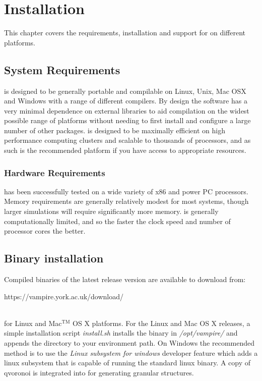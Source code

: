 \chapter{Installation}\label{chap:installation}

This chapter covers the requirements, installation and support for \vampire on different platforms. 

\section*{System Requirements}
\vampire is designed to be generally portable and compilable on Linux, Unix, Mac OSX and Windows with a range of different compilers. By design the software has a very minimal dependence on external libraries to aid compilation on the widest possible range of platforms without needing to first install and configure a large number of other packages. \vampire is designed to be maximally efficient on high performance computing clusters and scalable to thousands of processors, and as such is the recommended platform if you have access to appropriate resources. 

\subsection*{Hardware Requirements}
\vampire has been successfully tested on a wide variety of x86 and power PC processors. Memory requirements are generally relatively modest for most systems, though larger simulations will require significantly more memory. \vampire is generally computationally limited, and so the faster the clock speed and number of processor cores the better.

\section*{Binary installation}
Compiled binaries of the latest release version are available to download from:\\

\begin{minipage}[c]{\textwidth}
\centering
https://vampire.york.ac.uk/download/
\end{minipage}\\

\noindent for Linux and Mac$^{\mathrm{TM}}$ OS X platforms. For the Linux and Mac OS X releases, a simple installation script \textit{install.sh} installs the binary in \textit{/opt/vampire/} and appends the directory to your environment path. On Windows the recommended method is to use the \textit{Linux subsystem for windows} developer feature which adds a linux subsystem that is capable of running the standard linux binary. A copy of qvoronoi is integrated into \vampire for generating granular structures. 

